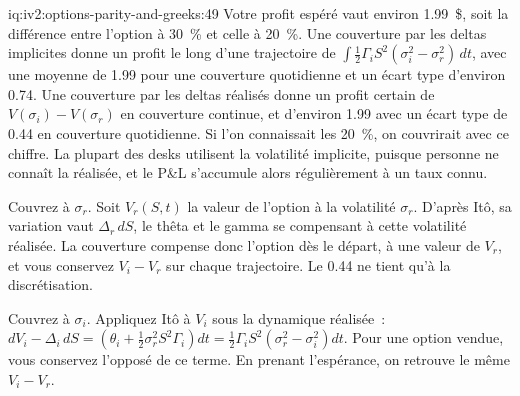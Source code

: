 \begin{solution}{iq:iv2:options-parity-and-greeks:49}
Votre profit espéré vaut environ 1.99~\$, soit la différence entre l'option à 30~\% et celle à 20~\%. Une couverture par les deltas implicites donne un profit le long d'une trajectoire de $\int\tfrac12\Gamma_iS^2(\sigma_i^2 - \sigma_r^2)\,dt$, avec une moyenne de 1.99 pour une couverture quotidienne et un écart type d'environ 0.74. Une couverture par les deltas réalisés donne un profit certain de $V(\sigma_i) - V(\sigma_r)$ en couverture continue, et d'environ 1.99 avec un écart type de 0.44 en couverture quotidienne. Si l'on connaissait les 20~\%, on couvrirait avec ce chiffre. La plupart des desks utilisent la volatilité implicite, puisque personne ne connaît la réalisée, et le P\&L s'accumule alors régulièrement à un taux connu.

Couvrez à $\sigma_r$. Soit $V_r(S, t)$ la valeur de l'option à la volatilité $\sigma_r$. D'après Itô, sa variation vaut $\Delta_r\,dS$, le thêta et le gamma se compensant à cette volatilité réalisée. La couverture compense donc l'option dès le départ, à une valeur de $V_r$, et vous conservez $V_i - V_r$ sur chaque trajectoire. Le 0.44 ne tient qu'à la discrétisation.

Couvrez à $\sigma_i$. Appliquez Itô à $V_i$ sous la dynamique réalisée~: $dV_i - \Delta_i\,dS = (\theta_i + \tfrac12\sigma_r^2S^2\Gamma_i)dt = \tfrac12\Gamma_iS^2(\sigma_r^2 - \sigma_i^2)dt$. Pour une option vendue, vous conservez l'opposé de ce terme. En prenant l'espérance, on retrouve le même $V_i - V_r$.

\end{solution}

